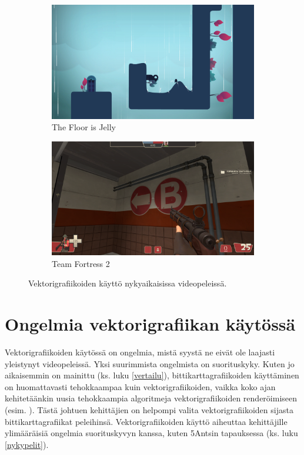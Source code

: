 \documentclass[utf8,bachelor]{gradu3}
\begin{document}
\begin{figure} [!b]
    \begin{subfigure}[t]{0.5\textwidth}
        \centering
        \includegraphics[width=0.8\linewidth]{jelly.png}
        \caption{The Floor is Jelly \parencite{RefWorks:doc:5beea20ce4b06f8a51cf9f11}}\label{jelly}
    \end{subfigure}
    \begin{subfigure}[t]{0.5\textwidth}
        \centering
        \includegraphics[width=0.8\linewidth]{tf2.png}
        \caption{Team Fortress 2 \parencite{RefWorks:doc:5bf037f1e4b0a014899520eb}}\label{tf2}
    \end{subfigure}
    \caption{Vektorigrafiikoiden käyttö nykyaikaisissa videopeleissä.}
\end{figure}

\section{Ongelmia vektorigrafiikan käytössä}


Vektorigrafiikoiden käytössä on ongelmia, mistä syystä ne eivät ole laajasti yleistynyt videopeleissä. Yksi suurimmista ongelmista on suorituskyky. Kuten jo aikaisemmin on mainittu (ks. luku \ref{vertailu}), bittikarttagrafiikoiden käyttäminen on huomattavasti tehokkaampaa kuin vektorigrafiikoiden, vaikka koko ajan kehitetäänkin uusia tehokkaampia algoritmeja vektorigrafiikoiden renderöimiseen (esim. \cite{RefWorks:doc:5bc4a5cce4b080e02f7eff1b}). Tästä johtuen kehittäjien on helpompi valita vektorigrafiikoiden sijasta bittikarttagrafiikat peleihinsä. Vektorigrafiikoiden käyttö aiheuttaa kehittäjille ylimääräisiä ongelmia suorituskyvyn kanssa, kuten 5Antsin tapauksessa (ks. luku \ref{nykypelit}).
\end{document}
